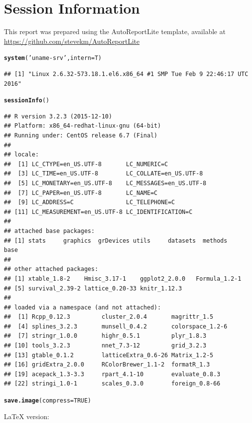 \documentclass[8pt]{beamer}\usepackage[]{graphicx}\usepackage[]{color}
\makeatletter
\newcommand{\hlnum}[1]{\textcolor[rgb]{0.686,0.059,0.569}{#1}}%
\newcommand{\hlstr}[1]{\textcolor[rgb]{0.192,0.494,0.8}{#1}}%
\newcommand{\hlstd}[1]{\textcolor[rgb]{0.345,0.345,0.345}{#1}}%
\newcommand{\hlkwc}[1]{\textcolor[rgb]{0.333,0.667,0.333}{#1}}%
\newcommand{\hlkwd}[1]{\textcolor[rgb]{0.737,0.353,0.396}{\textbf{#1}}}%
\newenvironment{kframe}{%
 \def\at@end@of@kframe{}%
 \ifinner\ifhmode%
  \def\at@end@of@kframe{\end{minipage}}%
  \begin{minipage}{\columnwidth}%
 \fi\fi%
 \def\FrameCommand##1{\hskip\@totalleftmargin \hskip-\fboxsep
 \colorbox{shadecolor}{##1}\hskip-\fboxsep
     \hskip-\linewidth \hskip-\@totalleftmargin \hskip\columnwidth}%
 \MakeFramed {\advance\hsize-\width
   \@totalleftmargin\z@ \linewidth\hsize
   \@setminipage}}%
 {\par\unskip\endMakeFramed%
 \at@end@of@kframe}
\newenvironment{knitrout}{}{} %
\makeatother
\begin{document}
\section{Session Information}
\small{This report was prepared using the AutoReportLite template, available at \url{https://github.com/stevekm/AutoReportLite}}
\begin{knitrout}\footnotesize
{}\color{fgcolor}\begin{kframe}
\begin{alltt}
\hlkwd{system}\hlstd{(}\hlstr{'uname -srv'}\hlstd{,}\hlkwc{intern}\hlstd{=T)}
\end{alltt}
\begin{verbatim}
## [1] "Linux 2.6.32-573.18.1.el6.x86_64 #1 SMP Tue Feb 9 22:46:17 UTC 2016"
\end{verbatim}
\begin{alltt}
\hlkwd{sessionInfo}\hlstd{()}
\end{alltt}
\begin{verbatim}
## R version 3.2.3 (2015-12-10)
## Platform: x86_64-redhat-linux-gnu (64-bit)
## Running under: CentOS release 6.7 (Final)
## 
## locale:
##  [1] LC_CTYPE=en_US.UTF-8       LC_NUMERIC=C              
##  [3] LC_TIME=en_US.UTF-8        LC_COLLATE=en_US.UTF-8    
##  [5] LC_MONETARY=en_US.UTF-8    LC_MESSAGES=en_US.UTF-8   
##  [7] LC_PAPER=en_US.UTF-8       LC_NAME=C                 
##  [9] LC_ADDRESS=C               LC_TELEPHONE=C            
## [11] LC_MEASUREMENT=en_US.UTF-8 LC_IDENTIFICATION=C       
## 
## attached base packages:
## [1] stats     graphics  grDevices utils     datasets  methods   base     
## 
## other attached packages:
## [1] xtable_1.8-2    Hmisc_3.17-1    ggplot2_2.0.0   Formula_1.2-1  
## [5] survival_2.39-2 lattice_0.20-33 knitr_1.12.3   
## 
## loaded via a namespace (and not attached):
##  [1] Rcpp_0.12.3         cluster_2.0.4       magrittr_1.5       
##  [4] splines_3.2.3       munsell_0.4.2       colorspace_1.2-6   
##  [7] stringr_1.0.0       highr_0.5.1         plyr_1.8.3         
## [10] tools_3.2.3         nnet_7.3-12         grid_3.2.3         
## [13] gtable_0.1.2        latticeExtra_0.6-26 Matrix_1.2-5       
## [16] gridExtra_2.0.0     RColorBrewer_1.1-2  formatR_1.3        
## [19] acepack_1.3-3.3     rpart_4.1-10        evaluate_0.8.3     
## [22] stringi_1.0-1       scales_0.3.0        foreign_0.8-66
\end{verbatim}
\begin{alltt}
\hlkwd{save.image}\hlstd{(}\hlkwc{compress} \hlstd{=} \hlnum{TRUE}\hlstd{)}
\end{alltt}
\end{kframe}
\end{knitrout}
\scriptsize{\LaTeX{} version: \LaTeXe~ \fmtversion}
\end{document}
